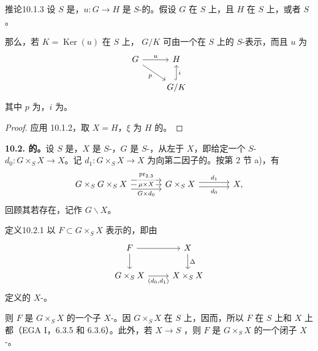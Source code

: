 \begin{SGAresult}{推论}{10.1.3}
设 $S$ 是，$u:G\to H$ 是 $S$-的。假设 $G$ 在 $S$ 上，且 $H$ 在 $S$ 上，或者 $S$ 。

那么，若 $K=\operatorname{Ker}(u)$ 在 $S$ 上， $G/K$ 可由一个在 $S$ 上的 $S$-表示，而且 $u$ 为
\[
\begin{tikzcd}
G\arrow[r,"u"]\arrow[dr,"p"']&H\\
&G/K\arrow[u,hook,"i"']
\end{tikzcd}
\]
其中 $p$ 为，$i$ 为。
\end{SGAresult}
\begin{proof}
应用 10.1.2，取 $X=H$，$\xi$ 为 $H$ 的。
\end{proof}

\textbf{10.2. 的。}设 $S$ 是，$X$ 是 $S$-，$G$ 是 $S$-，从左于 $X$，即给定一个 $S$- $d_0:G\times_SX\to X$。记 $d_1:G\times_SX\to X$ 为向第二因子的。按第 2 节 a)，有
\[
\begin{tikzcd}[column sep=large]
G\times_SG\times_SX\arrow[r,shift left=1.2ex,"{\operatorname{pr}_{2,3}}"]\arrow[r,"\mu\times X" description]\arrow[r,shift right=1.2ex,"G\times d_0"']&G\times_SX\arrow[r,shift left=.6ex,"d_1"]\arrow[r,shift right=.6ex,"d_0"']&X,
\end{tikzcd}
\]
回顾其若存在，记作 $G\backslash X$。
\begin{SGAresult}{定义}{10.2.1}
以 $F\subset G\times_SX$ 表示的，即由
\[
\begin{tikzcd}
F\arrow[r]\arrow[d]&X\arrow[d,"\Delta"]\\
G\times_SX\arrow[r,"{(d_0,d_1)}"']&X\times_SX
\end{tikzcd}
\]
定义的 $X$-。
\end{SGAresult}
则 $F$ 是 $G\times_SX$ 的一个子 $X$-。因 $G\times_SX$ 在 $S$ 上，因而，所以 $F$ 在 $S$ 上和 $X$ 上都（EGA I，6.3.5 和 6.3.6）。此外，若 $X\to S$ ，则 $F$ 是 $G\times_SX$ 的一个闭子 $X$-。

